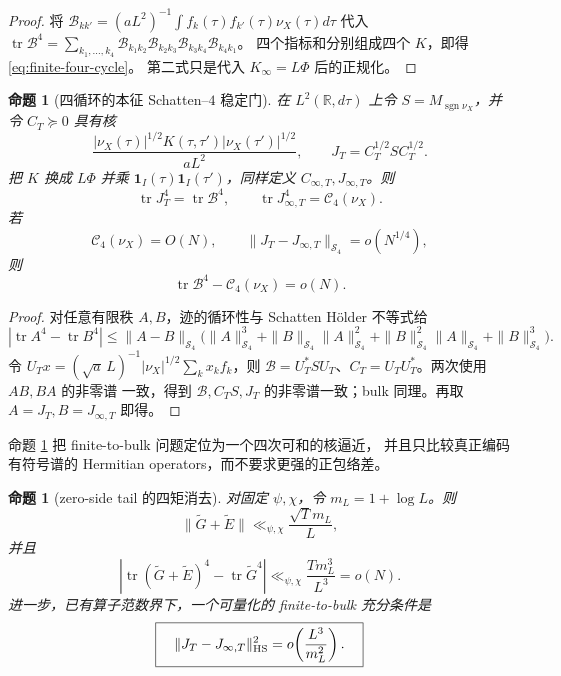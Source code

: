 \documentclass[UTF8,11pt,a4paper]{ctexart}
\newtheorem{proposition}[theorem]{命题}
\theoremstyle{definition}
\theoremstyle{remark}
\newcommand{\tr}{\operatorname{tr}}
\begin{document}
\begin{proof}
将
$\mathcal B_{kk'}=(aL^2)^{-1}\int f_k(\tau)f_{k'}(\tau)\nu_X(\tau)d\tau$
代入
$\tr\mathcal B^4=\sum_{k_1,\ldots,k_4}
\mathcal B_{k_1k_2}\mathcal B_{k_2k_3}
\mathcal B_{k_3k_4}\mathcal B_{k_4k_1}$。
四个指标和分别组成四个 $K$，即得 \eqref{eq:finite-four-cycle}。
第二式只是代入 $K_\infty=L\Phi$ 后的正规化。
\end{proof}

\begin{proposition}[四循环的本征 Schatten--$4$ 稳定门]\label{prop:s4-gate}
在 $L^2(\mathbb R,d\tau)$ 上令 $S=M_{\operatorname{sgn}\nu_X}$，并令 $C_T\succeq0$
具有核
\[
 \frac{|\nu_X(\tau)|^{1/2}K(\tau,\tau')
 |\nu_X(\tau')|^{1/2}}{aL^2},
 \qquad J_T=C_T^{1/2}SC_T^{1/2}.
\]
把 $K$ 换成 $L\Phi$ 并乘
$\mathbf1_I(\tau)\mathbf1_I(\tau')$，同样定义
$C_{\infty,T},J_{\infty,T}$。则
\[
 \tr J_T^4=\tr\mathcal B^4,\qquad
 \tr J_{\infty,T}^4=\mathcal C_4(\nu_X).
\]
若
\[
 \mathcal C_4(\nu_X)=O(N),\qquad
 \|J_T-J_{\infty,T}\|_{\mathcal S_4}=o(N^{1/4}),
 \label{eq:s4-gate}
\]
则
\[
 \tr\mathcal B^4-\mathcal C_4(\nu_X)=o(N).
\]
\end{proposition}

\begin{proof}
对任意有限秩 $A,B$，迹的循环性与 Schatten Hölder 不等式给
\[
 |\tr A^4-\tr B^4|
 \le\|A-B\|_{\mathcal S_4}
 \bigl(\|A\|_{\mathcal S_4}^3
 +\|B\|_{\mathcal S_4}\|A\|_{\mathcal S_4}^2
 +\|B\|_{\mathcal S_4}^2\|A\|_{\mathcal S_4}
 +\|B\|_{\mathcal S_4}^3\bigr).
\]
令
$U_Tx=(\sqrt{a}\,L)^{-1}|\nu_X|^{1/2}\sum_kx_kf_k$，则
$\mathcal B=U_T^*SU_T$、$C_T=U_TU_T^*$。两次使用 $AB,BA$ 的非零谱
一致，得到 $\mathcal B,C_TS,J_T$ 的非零谱一致；bulk 同理。再取
$A=J_T,B=J_{\infty,T}$ 即得。
\end{proof}

命题 \ref{prop:s4-gate} 把 finite-to-bulk 问题定位为一个四次可和的核逼近，
并且只比较真正编码有符号谱的 Hermitian operators，而不要求更强的正包络差。

\begin{proposition}[zero-side tail 的四矩消去]\label{prop:zero-tail-fourth}
对固定 $\psi,\chi$，令 $m_L=1+\log L$。则
\[
 \|\widetilde G+\widetilde E\|
 \ll_{\psi,\chi}\frac{\sqrt Tm_L}{L},
\]
并且
\[
 \left|\tr(\widetilde G+\widetilde E)^4-\tr\widetilde G^4\right|
 \ll_{\psi,\chi}\frac{Tm_L^3}{L^3}=o(N).
 \label{eq:zero-tail-fourth}
\]
进一步，已有算子范数界下，一个可量化的 finite-to-bulk 充分条件是
\[
 \boxed{\quad
 \|J_T-J_{\infty,T}\|_{\rm HS}^2
 =o\!\left(\frac{L^3}{m_L^2}\right).
 \quad}
 \label{eq:boundary-hs-target}
\]
\end{proposition}
\end{document}
